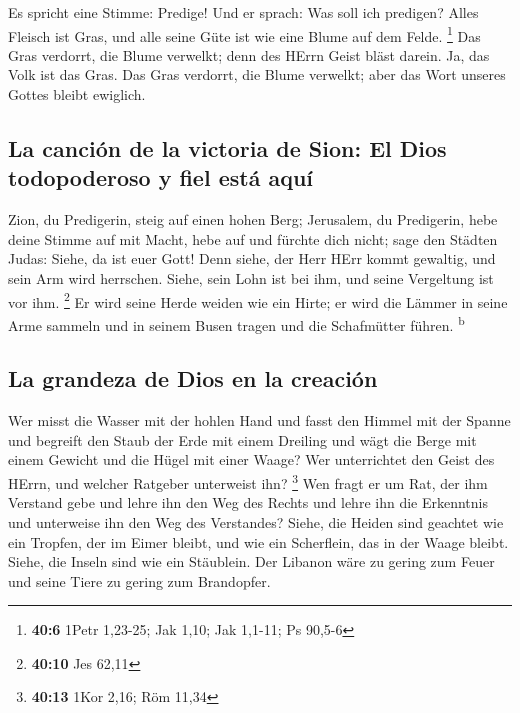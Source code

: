  Es spricht eine Stimme: Predige! Und er sprach: Was soll
ich predigen? Alles Fleisch ist Gras, und alle seine Güte ist wie eine
Blume auf dem Felde. \footnote{\textbf{40:6} 1Petr 1,23-25; Jak 1,10;
  Jak 1,1-11; Ps 90,5-6}  Das Gras verdorrt, die Blume
verwelkt; denn des HErrn Geist bläst darein. Ja, das Volk ist das Gras.
 Das Gras verdorrt, die Blume verwelkt; aber das Wort
unseres Gottes bleibt ewiglich.

\hypertarget{la-canciuxf3n-de-la-victoria-de-sion-el-dios-todopoderoso-y-fiel-estuxe1-aquuxed}{%
\subsection{La canción de la victoria de Sion: El Dios todopoderoso y
fiel está
aquí}\label{la-canciuxf3n-de-la-victoria-de-sion-el-dios-todopoderoso-y-fiel-estuxe1-aquuxed}}

 Zion, du Predigerin, steig auf einen hohen Berg;
Jerusalem, du Predigerin, hebe deine Stimme auf mit Macht, hebe auf und
fürchte dich nicht; sage den Städten Judas: Siehe, da ist euer Gott!
 Denn siehe, der Herr HErr kommt gewaltig, und sein Arm
wird herrschen. Siehe, sein Lohn ist bei ihm, und seine Vergeltung ist
vor ihm. \footnote{\textbf{40:10} Jes 62,11}  Er wird
seine Herde weiden wie ein Hirte; er wird die Lämmer in seine Arme
sammeln und in seinem Busen tragen und die Schafmütter führen.
\textsuperscript{b}

\hypertarget{la-grandeza-de-dios-en-la-creaciuxf3n}{%
\subsection{La grandeza de Dios en la
creación}\label{la-grandeza-de-dios-en-la-creaciuxf3n}}

 Wer misst die Wasser mit der hohlen Hand und fasst den
Himmel mit der Spanne und begreift den Staub der Erde mit einem Dreiling
und wägt die Berge mit einem Gewicht und die Hügel mit einer Waage?
 Wer unterrichtet den Geist des HErrn, und welcher
Ratgeber unterweist ihn? \footnote{\textbf{40:13} 1Kor 2,16; Röm 11,34}
 Wen fragt er um Rat, der ihm Verstand gebe und lehre ihn
den Weg des Rechts und lehre ihn die Erkenntnis und unterweise ihn den
Weg des Verstandes?  Siehe, die Heiden sind geachtet wie
ein Tropfen, der im Eimer bleibt, und wie ein Scherflein, das in der
Waage bleibt. Siehe, die Inseln sind wie ein Stäublein. 
Der Libanon wäre zu gering zum Feuer und seine Tiere zu gering zum
Brandopfer.

